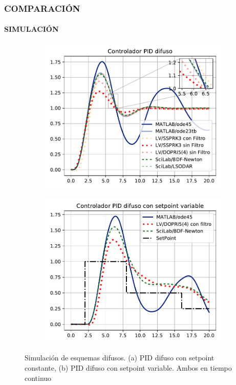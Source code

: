\documentclass[usenames,xcolor={dvipsnames, table}]{beamer}
\begin{document}
\begin{frame}
	\frametitle{COMPARACIÓN}
	\framesubtitle{SIMULACIÓN}
	\vspace{21pt}
	\begin{figure}[htb]
		\centering
		\begin{subfigure}[t]{0.49\textwidth}
			\centering
			\includegraphics[width=\textwidth]{imagenes/PIDcf1.pdf}
			\caption{}
		\end{subfigure}
		\hfill
		\begin{subfigure}[t]{0.49\textwidth}
			\centering
			\includegraphics[width=\textwidth]{imagenes/PIDcf2.pdf}
			\caption{}
		\end{subfigure}
		\caption{Simulación de esquemas difusos. (a) PID difuso con setpoint constante, (b) PID difuso con setpoint variable. Ambos en tiempo continuo}
	\end{figure}

\end{frame}
\end{document}
